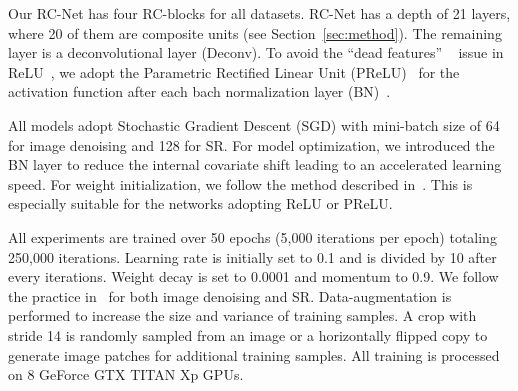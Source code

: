\documentclass[10pt,twocolumn,letterpaper]{article}
\begin{document}
Our RC-Net has four RC-blocks for all datasets. RC-Net has a depth of 21 layers, where 20 of them are composite units (see Section~\ref{sec:method}). The remaining layer is a deconvolutional layer (Deconv). To avoid the ``dead features''  ~\cite{zeiler2014visualizing} issue in ReLU~\cite{he2015delving}, we adopt the Parametric Rectified Linear Unit (PReLU)~\cite{he2015delving} for the activation function after each bach normalization layer (BN)~\cite{ioffe2015batch}. 

All models adopt Stochastic Gradient Descent (SGD) with mini-batch size of 64 for image denoising and 128 for SR. For model optimization, we introduced the BN layer to reduce the internal covariate shift leading to an accelerated learning speed. For weight initialization, we follow the method described in~\cite{he2015delving}. This is especially suitable for the networks adopting ReLU or PReLU.



All experiments are trained over 50 epochs (5,000 iterations per epoch) totaling 250,000 iterations. Learning rate is initially set to 0.1 and is divided by 10 after every  iterations. Weight decay is set to 0.0001 and momentum to 0.9. We follow the practice in~\cite{zhang2016beyond,mao2016image,kim2016accurate} for both image denoising and SR. Data-augmentation is performed to increase the size and variance of training samples. A  crop with stride 14 is randomly sampled from an image or a horizontally flipped copy to generate image patches for additional training samples. All training is processed on 8 GeForce GTX TITAN Xp GPUs.
\end{document}
